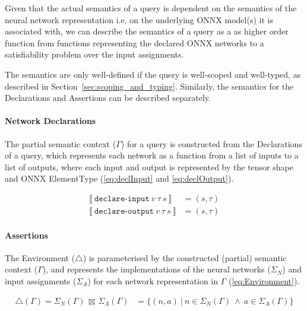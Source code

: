 Given that the actual semantics of a \vnnlib{} query is dependent on the semantics of the neural network representation i.e. on the underlying ONNX model(s) it is associated with, we can describe the semantics of a query as a as higher order function from functions representing the declared ONNX networks to a satisfiability problem over the input assignments. 

The semantics are only well-defined if the query is well-scoped and well-typed, as described in Section~\ref{sec:scoping_and_typing}. Similarly, the semantics for the Declarations and Assertions can be described separately.


\paragraph{Network Declarations}
The partial semantic context ($\Gamma$) for a \vnnlib{} query is constructed from the Declarations of a \vnnlib{} query, which represents each network as a function from a list of inputs to a list of outputs, where each input and output is represented by the tensor shape and ONNX ElementType (\autoref{eq:declInput} and \autoref{eq:declOutput}).

\begin{align}
    \llbracket~\texttt{declare-input}~v~\tau~s~\rrbracket &= (s, \tau) \label{eq:declInput}\\
    \llbracket~\texttt{declare-output}~v~\tau~s~\rrbracket &= (s, \tau) \label{eq:declOutput}
\end{align}


\paragraph{Assertions}
The Environment ($\triangle$) is parameterised by the constructed (partial) semantic context ($\Gamma$), and represents the implementations of the neural networks ($\Sigma_N$) and input assignments ($\Sigma_A$) for each network representation in $\Gamma$ (\autoref{eq:Environment}).

\begin{align} \label{eq:Environment}
    \triangle (\Gamma) = \Sigma_N(\Gamma)~\boxtimes~\Sigma_A(\Gamma) &= \{(n, a)~|~n \in \Sigma_N(\Gamma)~\land~a \in \Sigma_A(\Gamma)\}
\end{align}

